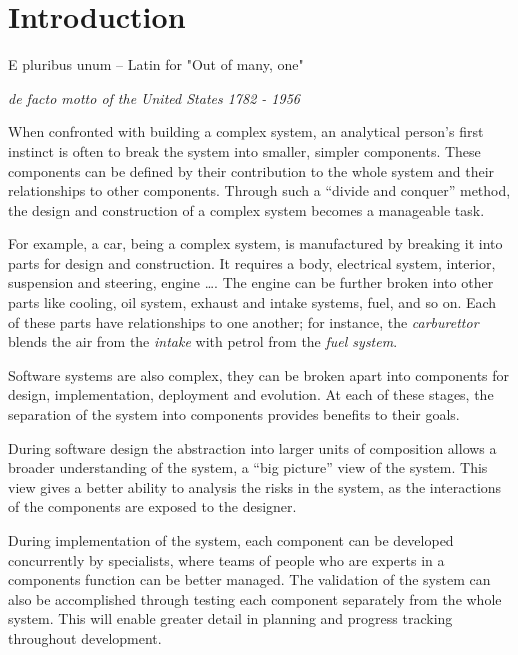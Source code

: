 \chapter{Introduction}
\label{introduction}
\epigraph{E pluribus unum -- Latin for "Out of many, one"}
{\textit{de facto motto of the United States 1782 - 1956}}

When confronted with building a complex system, an analytical person's first instinct is often to break the system into smaller, simpler components. 
These components can be defined by their contribution to the whole system and their relationships to other components.
Through such a ``divide and conquer'' method, the design and construction of a complex system becomes a manageable task.

For example, a car, being a complex system, is manufactured by breaking it into parts for design and construction.
It requires a body, electrical system, interior, suspension and steering, engine \ldots. 
The engine can be further broken into other parts like cooling, oil system, exhaust and intake systems, fuel, and so on.
Each of these parts have relationships to one another; for instance, the \textit{carburettor} blends the air from the \textit{intake} with petrol from the \textit{fuel system}.

Software systems are also complex, they can be broken apart into components for design, implementation, deployment and evolution.
At each of these stages, the separation of the system into components provides benefits to their goals.

During software design the abstraction into larger units of composition allows a broader understanding of the system, a ``big picture'' view of the system.
This view gives a better ability to analysis the risks in the system, as the interactions of the components are exposed to the designer.
 
During implementation of the system, each component can be developed concurrently by specialists, where teams of people who are experts in a components function can be better managed.
The validation of the system can also be accomplished through testing each component separately from the whole system.
This will enable greater detail in planning and progress tracking throughout development.

